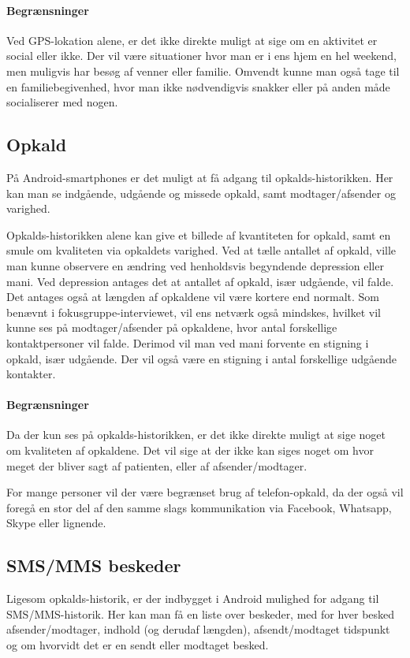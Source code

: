 \paragraph{Begrænsninger}
Ved GPS-lokation alene, er det ikke direkte muligt at sige om en aktivitet er social eller ikke.
Der vil være situationer hvor man er i ens hjem en hel weekend, men muligvis har besøg af venner eller familie.
Omvendt kunne man også tage til en familiebegivenhed, hvor man ikke nødvendigvis snakker eller på anden måde socialiserer med nogen.

\subsection{Opkald}
På Android-smartphones er det muligt at få adgang til opkalds-historikken.
Her kan man se indgående, udgående og missede opkald, samt modtager/afsender og varighed.

Opkalds-historikken alene kan give et billede af kvantiteten for opkald, samt en smule om kvaliteten via opkaldets varighed.
Ved at tælle antallet af opkald, ville man kunne observere en ændring ved henholdsvis begyndende depression eller mani.
Ved depression antages det at antallet af opkald, især udgående, vil falde.
Det antages også at længden af opkaldene vil være kortere end normalt.
Som benævnt i fokusgruppe-interviewet, vil ens netværk også mindskes, hvilket vil kunne ses på modtager/afsender på opkaldene, hvor antal forskellige kontaktpersoner vil falde.
Derimod vil man ved mani forvente en stigning i opkald, især udgående.
Der vil også være en stigning i antal forskellige udgående kontakter.

\paragraph{Begrænsninger}
Da der kun ses på opkalds-historikken, er det ikke direkte muligt at sige noget om kvaliteten af opkaldene.
Det vil sige at der ikke kan siges noget om hvor meget der bliver sagt af patienten, eller af afsender/modtager.

For mange personer vil der være begrænset brug af telefon-opkald, da der også vil foregå en stor del af den samme slags kommunikation via Facebook, Whatsapp, Skype eller lignende.

\subsection{SMS/MMS beskeder}
Ligesom opkalds-historik, er der indbygget i Android mulighed for adgang til SMS/MMS-historik.
Her kan man få en liste over beskeder, med for hver besked afsender/modtager, indhold (og derudaf længden), afsendt/modtaget tidspunkt og om hvorvidt det er en sendt eller modtaget besked.

